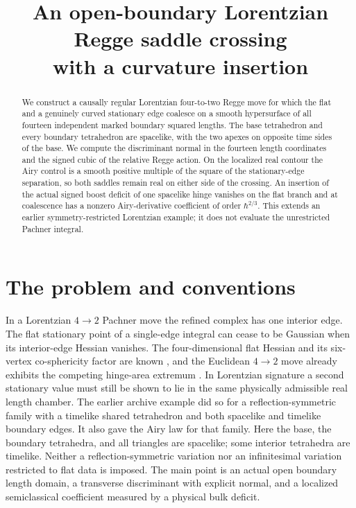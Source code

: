 \documentclass[11pt]{article}
\title{An open-boundary Lorentzian Regge saddle crossing\\with a curvature insertion}
\author{}
\date{}
\begin{document}
\maketitle
\begin{abstract}
We construct a causally regular Lorentzian four-to-two Regge move for which the flat and a genuinely curved stationary edge coalesce on a smooth hypersurface of all fourteen independent marked boundary squared lengths. The base tetrahedron and every boundary tetrahedron are spacelike, with the two apexes on opposite time sides of the base. We compute the discriminant normal in the fourteen length coordinates and the signed cubic of the relative Regge action. On the localized real contour the Airy control is a smooth positive multiple of the square of the stationary-edge separation, so both saddles remain real on either side of the crossing. An insertion of the actual signed boost deficit of one spacelike hinge vanishes on the flat branch and at coalescence has a nonzero Airy-derivative coefficient of order \(\hbar^{2/3}\). This extends an earlier symmetry-restricted Lorentzian example; it does not evaluate the unrestricted Pachner integral.
\end{abstract}

\section{The problem and conventions}

In a Lorentzian \(4\to2\) Pachner move the refined complex has one interior edge. The flat stationary point of a single-edge integral can cease to be Gaussian when its interior-edge Hessian vanishes. The four-dimensional flat Hessian and its six-vertex co-sphericity factor are known \cite{BD,DKS}, and the Euclidean \(4\to2\) move already exhibits the competing hinge-area extremum \cite{BahrDittrich}. In Lorentzian signature a second stationary value must still be shown to lie in the same physically admissible real length chamber. The earlier archive example \cite{Paper22} did so for a reflection-symmetric family with a timelike shared tetrahedron and both spacelike and timelike boundary edges. It also gave the Airy law for that family. Here the base, the boundary tetrahedra, and all triangles are spacelike; some interior tetrahedra are timelike. Neither a reflection-symmetric variation nor an infinitesimal variation restricted to flat data is imposed. The main point is an actual open boundary length domain, a transverse discriminant with explicit normal, and a localized semiclassical coefficient measured by a physical bulk deficit.
\end{document}
